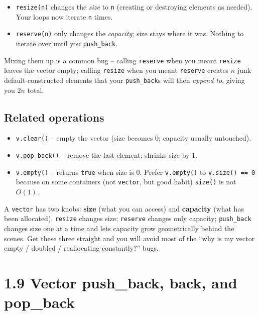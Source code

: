 \documentclass[11pt]{article}
\begin{document}
\begin{warnbox}
\begin{itemize}
    \item \texttt{resize(n)} changes the \emph{size} to \texttt{n}
          (creating or destroying elements as needed). Your loops
          now iterate \texttt{n} times.
    \item \texttt{reserve(n)} only changes the \emph{capacity};
          size stays where it was. Nothing to iterate over until you
          \texttt{push\_back}.
\end{itemize}
Mixing them up is a common bug -- calling \texttt{reserve} when you
meant \texttt{resize} leaves the vector empty; calling
\texttt{resize} when you meant \texttt{reserve} creates $n$ junk
default-constructed elements that your \texttt{push\_back}s will
then \emph{append to}, giving you $2n$ total.
\end{warnbox}

\subsection{Related operations}

\begin{itemize}
    \item \texttt{v.clear()} -- empty the vector (size becomes 0;
          capacity usually untouched).
    \item \texttt{v.pop\_back()} -- remove the last element; shrinks
          size by 1.
    \item \texttt{v.empty()} -- returns \texttt{true} when size is
          0. Prefer \texttt{v.empty()} to \texttt{v.size() == 0}
          because on some containers (not \texttt{vector}, but good
          habit) \texttt{size()} is not $O(1)$.
\end{itemize}

\begin{ideabox}
A \texttt{vector} has two knobs: \textbf{size} (what you can access)
and \textbf{capacity} (what has been allocated). \texttt{resize}
changes size; \texttt{reserve} changes only capacity;
\texttt{push\_back} changes size one at a time and lets capacity
grow geometrically behind the scenes. Get these three straight and
you will avoid most of the ``why is my vector empty / doubled /
reallocating constantly?'' bugs.
\end{ideabox}

\section{1.9 Vector push\_back, back, and pop\_back}
\end{document}
